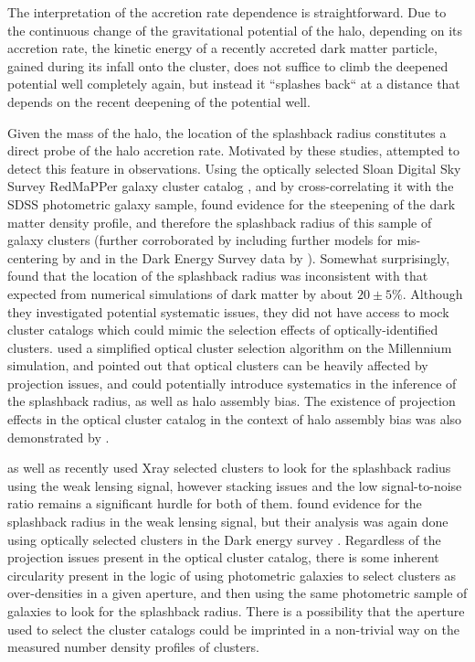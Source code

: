 \documentclass[iop, apjl, twocolappendix, numberedappendix]{emulateapj}
\begin{document}
The interpretation of the accretion rate dependence is
straightforward. Due to the continuous change of the gravitational
potential of the halo, depending on its accretion rate, the kinetic
energy of a recently accreted dark matter particle, gained during
its infall onto the cluster, does not suffice to climb the deepened
potential well completely again, but instead it ``splashes back`` at
a distance that depends on the recent deepening of the potential
well.

Given the mass of the halo, the location of the splashback radius
constitutes a direct probe of the halo accretion rate. Motivated by
these studies, \citet{more2016detection} attempted to detect this
feature in observations. Using the optically selected Sloan Digital
Sky Survey RedMaPPer galaxy cluster catalog
\citep{rykoff2014redmapper}, and by cross-correlating it with the
SDSS photometric galaxy sample, \citet{more2016detection} found evidence
for the steepening of the dark matter density profile, and therefore
the splashback radius of this sample of galaxy clusters (further
corroborated by including further models for mis-centering by
\citet{baxter2017halo} and in the Dark Energy Survey data by
\citet{chang2017splashback}). Somewhat surprisingly,
\citet{more2016detection} found that the location of the splashback
radius was inconsistent with that expected from numerical
simulations of dark matter by about $20\pm5$\%. Although they
investigated potential systematic issues, they did not have access
to mock cluster catalogs which could mimic the selection effects of
optically-identified clusters. \citet{busch2017assembly} used a
simplified optical cluster selection algorithm on the Millennium
simulation, and pointed out that optical clusters can be heavily
affected by projection issues, and could potentially introduce
systematics in the inference of the splashback radius, as well as
halo assembly bias. The existence of projection effects in the
optical cluster catalog in the context of halo assembly bias was 
also demonstrated by \citet{zu2016level}.

\citet{umetsu2017lensing} as well as \citet{contigiani2018weak}
recently used Xray selected clusters to look for the splashback radius
using the weak lensing signal, however stacking issues and the low
signal-to-noise ratio remains a significant hurdle for both of them.
\citet{chang2017splashback} found evidence for the splashback radius
in the weak lensing signal, but their analysis was again done using
optically selected clusters in the Dark energy survey
\citep{dark2005dark}. Regardless of the projection issues present in
the optical cluster catalog, there is some inherent circularity
present in the logic of using photometric galaxies to select
clusters as over-densities in a given aperture, and then using the
same photometric sample of galaxies to look for the splashback
radius. There is a possibility that the aperture used to select the
cluster catalogs could be imprinted in a non-trivial way on the measured number
density profiles of clusters.
\end{document}
